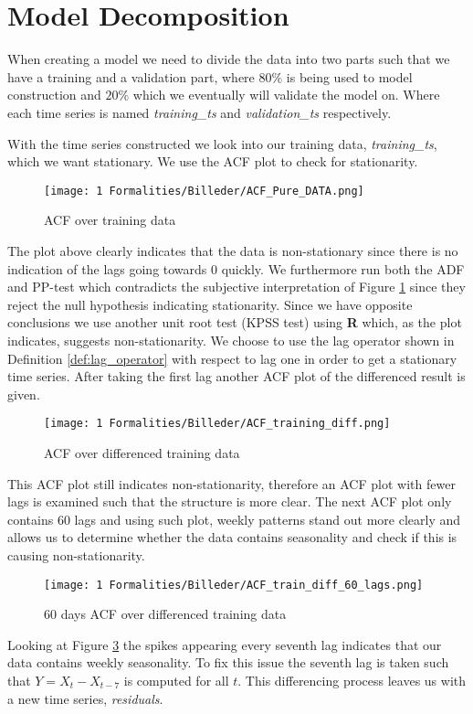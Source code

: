 \section{Model Decomposition}
When creating a model we need to divide the data into two parts such that we have a training and a validation part, where $80\%$ is being used to model construction and $20\%$ which we eventually will validate the model on. Where each time series is named \textit{training\_ts} and \textit{validation\_ts} respectively.

\noindent With the time series constructed we look into our training data, \textit{training\_ts}, which we want stationary. We use the ACF plot to check for stationarity.
\begin{figure}[H]
    \centering
    \texttt{[image: 1 Formalities/Billeder/ACF\_Pure\_DATA.png]}
    \caption{ACF over training data}
    \label{Fig:ACF_training_ts}
\end{figure}
\noindent The plot above clearly indicates that the data is non-stationary since there is no indication of the lags going towards 0 quickly. We furthermore run both the ADF and PP-test which contradicts the subjective interpretation of Figure \ref{Fig:ACF_training_ts} since they reject the null hypothesis indicating stationarity. Since we have opposite conclusions we use another unit root test (KPSS test) using \textbf{R} which, as the plot indicates, suggests non-stationarity. We choose to use the lag operator shown in Definition \ref{def:lag_operator} with respect to lag one in order to get a stationary time series. After taking the first lag another ACF plot of the differenced result is given. 
\begin{figure}[H]
    \centering
    \texttt{[image: 1 Formalities/Billeder/ACF\_training\_diff.png]}
    \caption{ACF over differenced training data}
    \label{FIG:ACF_TRAINIONG_DIFF}
\end{figure}
\noindent This ACF plot still indicates non-stationarity, therefore an ACF plot with fewer lags is examined such that the structure is more clear. The next ACF plot only contains 60 lags and using such plot, weekly patterns stand out more clearly and allows us to determine whether the data contains seasonality and check if this is causing non-stationarity.
\begin{figure}[H]
    \centering
    \texttt{[image: 1 Formalities/Billeder/ACF\_train\_diff\_60\_lags.png]}
    \caption{60 days ACF over differenced training data}
    \label{fig:ACF_diff_ts_60}
\end{figure}
\noindent Looking at Figure \ref{fig:ACF_diff_ts_60} the spikes appearing every seventh lag indicates that our data contains weekly seasonality. To fix this issue the seventh lag is taken such that $Y=X_t-X_{t-7}$ is computed for all $t$. This differencing process leaves us with a new time series, \textit{residuals}.

